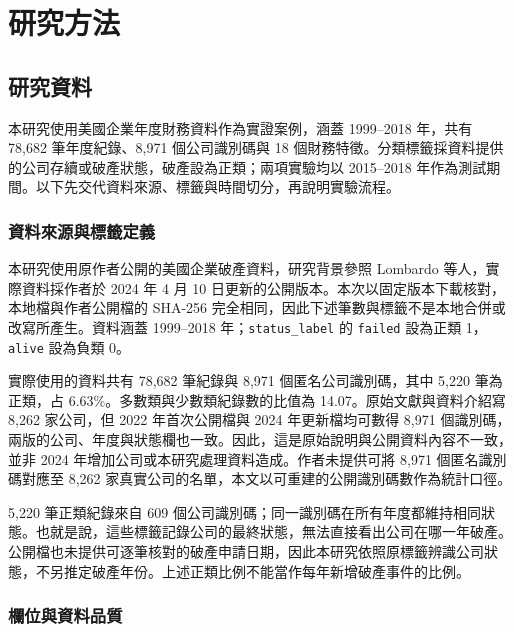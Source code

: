 \chapter{研究方法}\label{chap:method}
\begingroup
\setlength{\emergencystretch}{2em}

\section{研究資料}\label{sec:method-data}

本研究使用美國企業年度財務資料作為實證案例，涵蓋 1999--2018 年，共有 78,682 筆年度紀錄、8,971 個公司識別碼與 18 個財務特徵。分類標籤採資料提供的公司存續或破產狀態，破產設為正類；兩項實驗均以 2015--2018 年作為測試期間。以下先交代資料來源、標籤與時間切分，再說明實驗流程。

\subsection{資料來源與標籤定義}

本研究使用原作者公開的美國企業破產資料，研究背景參照 Lombardo 等人\autocite{lombardo2022bankruptcy}，實際資料採作者於 2024 年 4 月 10 日更新的公開版本\autocite{sowide-bankruptcy-data}。本次以固定版本下載核對，本地檔與作者公開檔的 SHA-256 完全相同，因此下述筆數與標籤不是本地合併或改寫所產生。資料涵蓋 1999--2018 年；\nolinkurl{status_label} 的 \nolinkurl{failed} 設為正類 1，\nolinkurl{alive} 設為負類 0。

實際使用的資料共有 78,682 筆紀錄與 8,971 個匿名公司識別碼，其中 5,220 筆為正類，占 6.63\%。多數類與少數類紀錄數的比值為 14.07。原始文獻與資料介紹寫 8,262 家公司，但 2022 年首次公開檔與 2024 年更新檔均可數得 8,971 個識別碼，兩版的公司、年度與狀態欄也一致。因此，這是原始說明與公開資料內容不一致，並非 2024 年增加公司或本研究處理資料造成。作者未提供可將 8,971 個匿名識別碼對應至 8,262 家真實公司的名單，本文以可重建的公開識別碼數作為統計口徑。

5,220 筆正類紀錄來自 609 個公司識別碼；同一識別碼在所有年度都維持相同狀態。也就是說，這些標籤記錄公司的最終狀態，無法直接看出公司在哪一年破產。公開檔也未提供可逐筆核對的破產申請日期，因此本研究依照原標籤辨識公司狀態，不另推定破產年份。上述正類比例不能當作每年新增破產事件的比例。

\subsection{欄位與資料品質}

